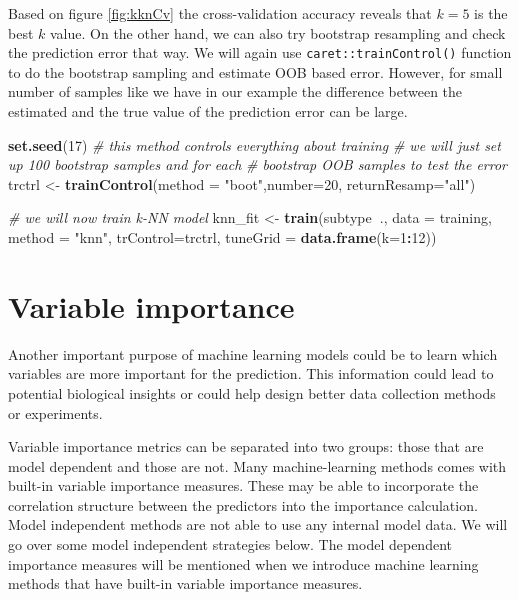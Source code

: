 \documentclass[12pt,]{krantz}
\newenvironment{Shaded}{\begin{snugshade}}{\end{snugshade}}
\newcommand{\CommentTok}[1]{\textcolor[rgb]{0.56,0.35,0.01}{\textit{#1}}}
\newcommand{\DataTypeTok}[1]{\textcolor[rgb]{0.13,0.29,0.53}{#1}}
\newcommand{\DecValTok}[1]{\textcolor[rgb]{0.00,0.00,0.81}{#1}}
\newcommand{\KeywordTok}[1]{\textcolor[rgb]{0.13,0.29,0.53}{\textbf{#1}}}
\newcommand{\NormalTok}[1]{#1}
\newcommand{\OperatorTok}[1]{\textcolor[rgb]{0.81,0.36,0.00}{\textbf{#1}}}
\newcommand{\StringTok}[1]{\textcolor[rgb]{0.31,0.60,0.02}{#1}}
\begin{document}
Based on figure \ref{fig:kknCv} the cross-validation accuracy reveals that \(k=5\) is the best \(k\) value. On the other hand, we can also try bootstrap resampling and check the prediction error that way. We will again use \texttt{caret::trainControl()} function to do the bootstrap sampling and estimate OOB based error. However, for small number of samples like we have in our example the difference between the estimated and the true value of the prediction error can be large.

\begin{Shaded}
\begin{Highlighting}[]
\KeywordTok{set.seed}\NormalTok{(}\DecValTok{17}\NormalTok{)}
\CommentTok{# this method controls everything about training}
\CommentTok{# we will just set up 100 bootstrap samples and for each }
\CommentTok{# bootstrap OOB samples to test the error}
\NormalTok{trctrl <-}\StringTok{ }\KeywordTok{trainControl}\NormalTok{(}\DataTypeTok{method =} \StringTok{"boot"}\NormalTok{,}\DataTypeTok{number=}\DecValTok{20}\NormalTok{,}
                       \DataTypeTok{returnResamp=}\StringTok{"all"}\NormalTok{)}

\CommentTok{# we will now train k-NN model}
\NormalTok{knn_fit <-}\StringTok{ }\KeywordTok{train}\NormalTok{(subtype}\OperatorTok{~}\NormalTok{., }\DataTypeTok{data =}\NormalTok{ training, }
                 \DataTypeTok{method =} \StringTok{"knn"}\NormalTok{,}
                 \DataTypeTok{trControl=}\NormalTok{trctrl,}
                 \DataTypeTok{tuneGrid =} \KeywordTok{data.frame}\NormalTok{(}\DataTypeTok{k=}\DecValTok{1}\OperatorTok{:}\DecValTok{12}\NormalTok{))}
\end{Highlighting}
\end{Shaded}

\hypertarget{variable-importance}{%
\section{Variable importance}\label{variable-importance}}

Another important purpose of machine learning models could be to learn which variables are more important for the prediction. This information could lead to potential biological insights or could help design better data collection methods or experiments.

Variable importance metrics can be separated into two groups: those that are model dependent and those are not. Many machine-learning methods comes with built-in variable importance measures. These may be able to incorporate the correlation structure between the predictors into the importance calculation. Model independent methods are not able to use any internal model data. We will go over some model independent strategies below. The model dependent importance measures will be mentioned when we introduce machine learning methods that have built-in variable importance measures.
\end{document}
